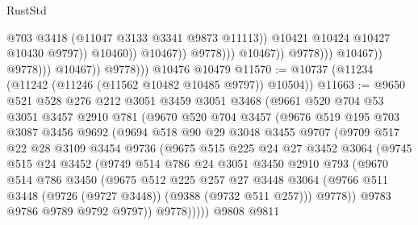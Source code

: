 \begin{lexlean}{RustStd}
\begin{coremodule}
                                                      @703
                                                      @3418
                                                      (@11047 @3133 @3341 @9873 @11113))
                                                    @10421
                                                    @10424
                                                    @10427
                                                    @10430
                                                    @9797))
                                                @10460))
                                            @10467))
                                        @9778)))
                                  @10467))
                              @9778)))
                        @10467))
                    @9778)))
              @10467))
          @9778)))
    @10476
    @10479
@11570 := @10737 (@11234 (@11242 (@11246 (@11562 @10482 @10485 @9797)) @10504))
@11663 := @9650
    @521
    @528
    @276
    @212
    @3051
    @3459
    @3051
    @3468
    (@9661
      @520
      @704
      @53
      @3051
      @3457
      @2910
      @781
      (@9670
        @520
        @704
        @3457
        (@9676
          @519
          @195
          @703
          @3087
          @3456
          @9692
          (@9694
            @518
            @90
            @29
            @3048
            @3455
            @9707
            (@9709
              @517
              @22
              @28
              @3109
              @3454
              @9736
              (@9675
                @515
                @225
                @24
                @27
                @3452
                @3064
                (@9745
                  @515
                  @24
                  @3452
                  (@9749
                    @514
                    @786
                    @24
                    @3051
                    @3450
                    @2910
                    @793
                    (@9670
                      @514
                      @786
                      @3450
                      (@9675
                        @512
                        @225
                        @257
                        @27
                        @3448
                        @3064
                        (@9766 @511 @3448 (@9726 (@9727 @3448)) (@9388 (@9732 @511 @257)))
                        @9778))
                    @9783
                    @9786
                    @9789
                    @9792
                    @9797))
                @9778)))))
      @9808
      @9811

\end{coremodule}
\end{lexlean}
